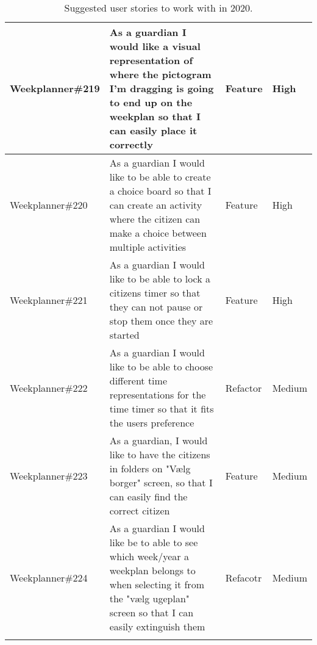 \begin{longtable}{|p{2.9cm}|p{7cm}|p{1.4cm}|p{1.5cm}|}
    Weekplanner\#219 & As a guardian I would like a visual representation of where the pictogram I'm dragging is going to end up on the weekplan so that I can easily place it correctly         & Feature & High   \\ \hline
    Weekplanner\#220 & As a guardian I would like to be able to create a choice board so that I can create an activity where the citizen can make a choice between multiple activities           & Feature & High  \\ \hline
    Weekplanner\#221 & As a guardian I would like to be able to lock a citizens timer so that they can not pause or stop them once they are started                                              & Feature     & High  \\ \hline
    Weekplanner\#222 & As a guardian I would like to be able to choose different time representations for the time timer so that it fits the users preference                                    & Refactor     & Medium  \\ \hline
    Weekplanner\#223 & As a guardian, I would like to have the citizens in folders on "Vælg borger" screen, so that I can easily find the correct citizen                                        & Feature     & Medium  \\ \hline
    Weekplanner\#224 & As a guardian I would like be to able to see which week/year a weekplan belongs to when selecting it from the "vælg ugeplan" screen so that I can easily extinguish them  & Refacotr   & Medium  \\ \hline
    \caption{Suggested user stories to work with in 2020.}\label{sprint-2-review-table}
\end{longtable}

